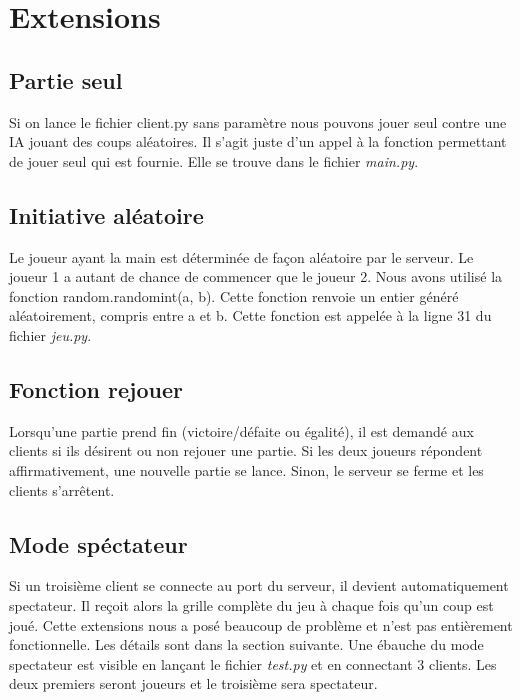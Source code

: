 \documentclass[11pt]{report}
\begin{document}
\section{Extensions}

\subsection*{Partie seul}

Si on lance le fichier client.py sans paramètre nous pouvons jouer seul
contre une IA jouant des coups aléatoires.
Il s'agit juste d'un appel à la fonction permettant de jouer seul qui
est fournie. Elle se trouve dans le fichier \textit{main.py}.

\subsection*{Initiative aléatoire}

Le joueur ayant la main est déterminée de façon aléatoire par le serveur.
Le joueur 1 a autant de chance de commencer que le joueur 2.
Nous avons utilisé la fonction random.randomint(a, b). Cette fonction renvoie
un entier généré aléatoirement, compris entre a et b.
Cette fonction est appelée à la ligne 31 du fichier \textit{jeu.py}.

\subsection*{Fonction rejouer}

Lorsqu'une partie prend fin (victoire/défaite ou égalité), il est demandé aux
clients si ils désirent ou non rejouer une partie.
Si les deux joueurs répondent affirmativement, une nouvelle partie se lance.
Sinon, le serveur se ferme et les clients s'arrêtent.

\subsection*{Mode spéctateur}

Si un troisième client se connecte au port du serveur, il devient automatiquement
spectateur. Il reçoit alors la grille complète du jeu à chaque fois qu'un coup
est joué.
Cette extensions nous a posé beaucoup de problème et n'est pas entièrement
fonctionnelle. Les détails sont dans la section suivante.
Une ébauche du mode spectateur est visible en lançant
le fichier \textit{test.py} et en connectant 3 clients. Les deux premiers
seront joueurs et le troisième sera spectateur.
\end{document}
